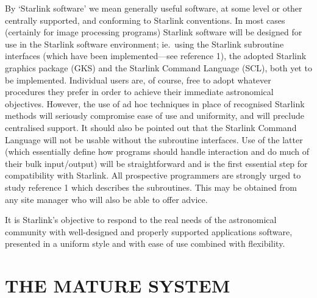 By `Starlink software' we mean generally useful software, at some
level or other centrally supported, and conforming to Starlink conventions.
In most cases (certainly for image processing programs) Starlink software will
be designed for use in the Starlink software environment; ie.\ using the
Starlink subroutine interfaces (which have been implemented---see reference
1), the adopted Starlink graphics package (GKS) and the Starlink Command
Language (SCL), both yet to be implemented.
Individual users are, of course, free to adopt whatever procedures they prefer
in order to achieve their immediate astronomical objectives.
However, the use of ad hoc techniques in place of recognised Starlink methods
will seriously compromise ease of use and uniformity, and will preclude
centralised support.
It should also be pointed out that the Starlink Command Language will not be
usable without the subroutine interfaces.
Use of the latter (which essentially define how programs should handle
interaction and do much of their bulk input/output) will be straightforward and
is the first essential step for compatibility with Starlink.
All prospective programmers are strongly urged to study reference 1 which
describes the subroutines.
This may be obtained from any site manager who will also be able to offer
advice.

It is Starlink's objective to respond to the real needs of the astronomical
community with well-designed and properly supported applications software,
presented in a uniform style and with ease of use combined with flexibility.
\section {THE MATURE SYSTEM}
